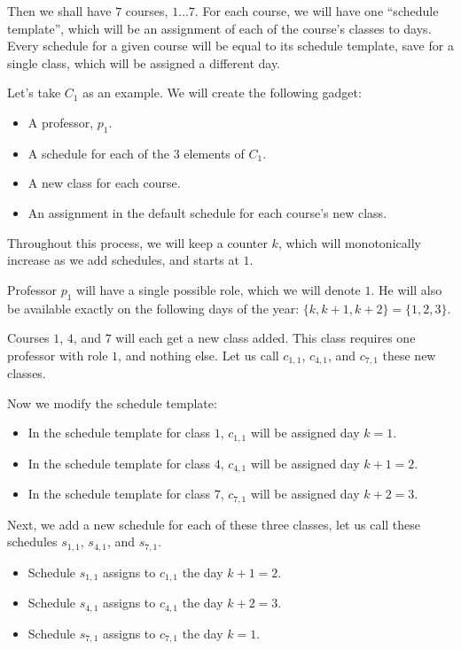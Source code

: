 Then we shall have $7$ courses, $1 \dots 7$. For each course, we will have one ``schedule template'', which will be an assignment of each of the course's classes to days. Every schedule for a given course will be equal to its schedule template, save for a single class, which will be assigned a different day.

Let's take {\color{BrickRed}$C_1$} as an example. We will create the following gadget:
\begin{itemize}
\item A professor, $p_1$.
\item A schedule for each of the $3$ elements of {\color{BrickRed}$C_1$}.
\item A new class for each course.
\item An assignment in the default schedule for each course's new class.
\end{itemize}

Throughout this process, we will keep a counter $k$, which will monotonically increase as we add schedules, and starts at $1$.

Professor $p_1$ will have a single possible role, which we will denote $1$. He will also be available exactly on the following days of the year: $\{k, k + 1, k + 2\} = \{1, 2, 3\}$.

Courses $1$, $4$, and $7$ will each get a new class added. This class requires one professor with role $1$, and nothing else. Let us call $c_{1, 1}$, $c_{4, 1}$, and $c_{7, 1}$ these new classes.

Now we modify the schedule template:
\begin{itemize}
\item In the schedule template for class $1$, $c_{1, 1}$ will be assigned day $k = 1$.
\item In the schedule template for class $4$, $c_{4, 1}$ will be assigned day $k + 1 = 2$.
\item In the schedule template for class $7$, $c_{7, 1}$ will be assigned day $k + 2 = 3$.
\end{itemize}

Next, we add a new schedule for each of these three classes, let us call these schedules $s_{1, 1}$, $s_{4, 1}$, and $s_{7, 1}$.
\begin{itemize}
\item Schedule $s_{1, 1}$ assigns to $c_{1, 1}$ the day $k + 1 = 2$.
\item Schedule $s_{4, 1}$ assigns to $c_{4, 1}$ the day $k + 2 = 3$.
\item Schedule $s_{7, 1}$ assigns to $c_{7, 1}$ the day $k = 1$.
\end{itemize}

